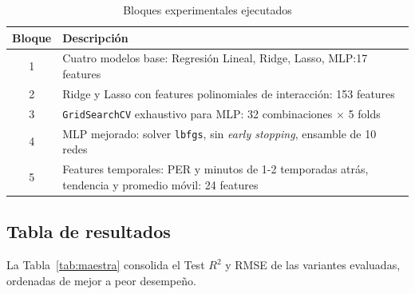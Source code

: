 \documentclass[11pt,a4paper]{article}
\begin{document}
\begin{table}[H]
\centering
\caption{Bloques experimentales ejecutados}
\label{tab:plan_experimentos}
\renewcommand{\arraystretch}{1.3}
\begin{tabularx}{\textwidth}{|c|X|}
\hline
\rowcolor{celeste}
\textbf{Bloque} & \textbf{Descripción} \\
\hline
1 & Cuatro modelos base: Regresión Lineal, Ridge, Lasso, MLP:17 features \\
\hline
2 & Ridge y Lasso con features polinomiales de interacción: 153 features \\
\hline
3 & \texttt{GridSearchCV} exhaustivo para MLP: 32 combinaciones $\times$ 5 folds \\
\hline
4 & MLP mejorado: solver \texttt{lbfgs}, sin \textit{early stopping},
ensamble de 10 redes \\
\hline
5 & Features temporales: PER y minutos de 1-2 temporadas atrás, tendencia
y promedio móvil: 24 features \\
\hline
\end{tabularx}
\end{table}

\subsection{Tabla de resultados}

La Tabla~\ref{tab:maestra} consolida el Test $R^2$ y RMSE de las
variantes evaluadas, ordenadas de mejor a peor desempeño.
\end{document}
